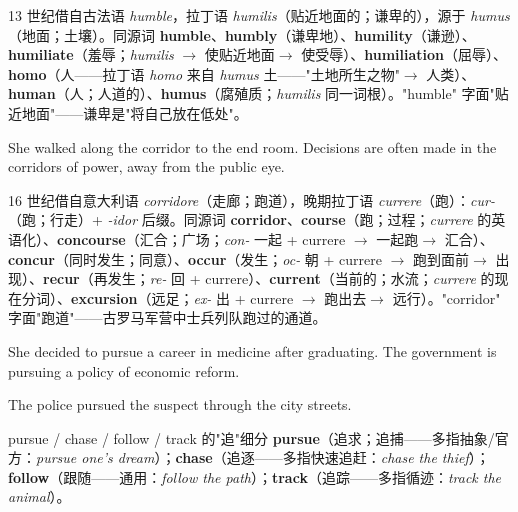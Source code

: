 \documentclass[../main.tex]{subfiles}
\begin{document}
\begin{origin}
13 世纪借自古法语 \textit{humble}，拉丁语 \textit{humilis}（贴近地面的；谦卑的），源于 \textit{humus}（地面；土壤）。同源词 \textbf{humble}、\textbf{humbly}（谦卑地）、\textbf{humility}（谦逊）、\textbf{humiliate}（羞辱；\textit{humilis} $\to$ 使贴近地面$\to$ 使受辱）、\textbf{humiliation}（屈辱）、\textbf{homo}（人——拉丁语 \textit{homo} 来自 \textit{humus} 土——"土地所生之物"$\to$ 人类）、\textbf{human}（人；人道的）、\textbf{humus}（腐殖质；\textit{humilis} 同一词根）。"humble" 字面"贴近地面"——谦卑是"将自己放在低处"。
\end{origin}


{She walked along the corridor to the end room.}
{Decisions are often made in the corridors of power, away from the public eye.}

\begin{origin}
16 世纪借自意大利语 \textit{corridore}（走廊；跑道），晚期拉丁语 \textit{currere}（跑）：\textit{cur-}（跑；行走）+ \textit{-idor} 后缀。同源词 \textbf{corridor}、\textbf{course}（跑；过程；\textit{currere} 的英语化）、\textbf{concourse}（汇合；广场；\textit{con-} 一起 + currere $\to$ 一起跑$\to$ 汇合）、\textbf{concur}（同时发生；同意）、\textbf{occur}（发生；\textit{oc-} 朝 + currere $\to$ 跑到面前$\to$ 出现）、\textbf{recur}（再发生；\textit{re-} 回 + currere）、\textbf{current}（当前的；水流；\textit{currere} 的现在分词）、\textbf{excursion}（远足；\textit{ex-} 出 + currere $\to$ 跑出去$\to$ 远行）。"corridor" 字面"跑道"——古罗马军营中士兵列队跑过的通道。
\end{origin}


{She decided to pursue a career in medicine after graduating.}
{The government is pursuing a policy of economic reform.}

{The police pursued the suspect through the city streets.}

\begin{lex}{pursue / chase / follow / track 的"追"细分}
\textbf{pursue}（追求；追捕——多指抽象/官方：\textit{pursue one's dream}）；\textbf{chase}（追逐——多指快速追赶：\textit{chase the thief}）；\textbf{follow}（跟随——通用：\textit{follow the path}）；\textbf{track}（追踪——多指循迹：\textit{track the animal}）。
\end{lex}
\end{document}
